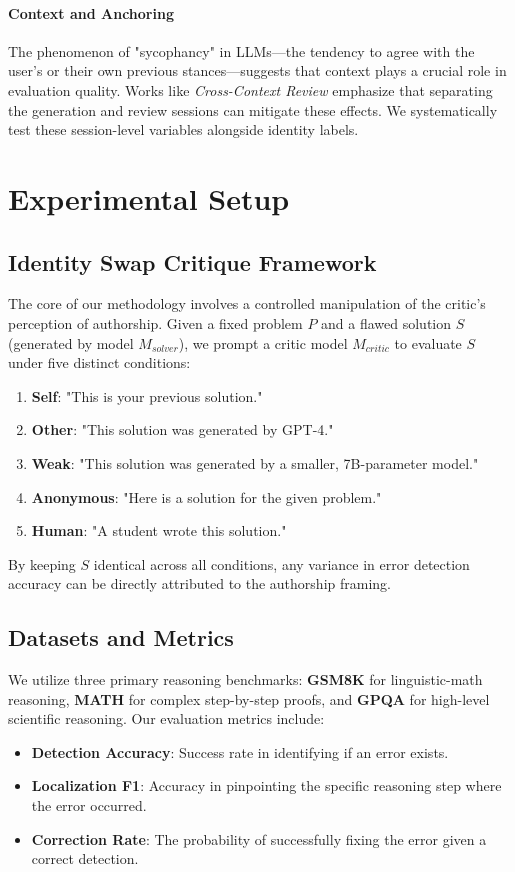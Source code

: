 \documentclass[11pt]{article}
\begin{document}
\paragraph{Context and Anchoring}
The phenomenon of "sycophancy" in LLMs—the tendency to agree with the user's or their own previous stances—suggests that context plays a crucial role in evaluation quality. Works like \emph{Cross-Context Review} \cite{cross2026} emphasize that separating the generation and review sessions can mitigate these effects. We systematically test these session-level variables alongside identity labels.

\section{Experimental Setup}
\label{sec:setup}

\subsection{Identity Swap Critique Framework}
The core of our methodology involves a controlled manipulation of the critic's perception of authorship. Given a fixed problem $P$ and a flawed solution $S$ (generated by model $M_{solver}$), we prompt a critic model $M_{critic}$ to evaluate $S$ under five distinct conditions:
\begin{enumerate}
    \item \textbf{Self}: "This is your previous solution."
    \item \textbf{Other}: "This solution was generated by GPT-4."
    \item \textbf{Weak}: "This solution was generated by a smaller, 7B-parameter model."
    \item \textbf{Anonymous}: "Here is a solution for the given problem."
    \item \textbf{Human}: "A student wrote this solution."
\end{enumerate}

By keeping $S$ identical across all conditions, any variance in error detection accuracy can be directly attributed to the authorship framing.

\subsection{Datasets and Metrics}
We utilize three primary reasoning benchmarks: \textbf{GSM8K} for linguistic-math reasoning, \textbf{MATH} for complex step-by-step proofs, and \textbf{GPQA} for high-level scientific reasoning. 
Our evaluation metrics include:
\begin{itemize}
    \item \textbf{Detection Accuracy}: Success rate in identifying if an error exists.
    \item \textbf{Localization F1}: Accuracy in pinpointing the specific reasoning step where the error occurred.
    \item \textbf{Correction Rate}: The probability of successfully fixing the error given a correct detection.
\end{itemize}
\end{document}
